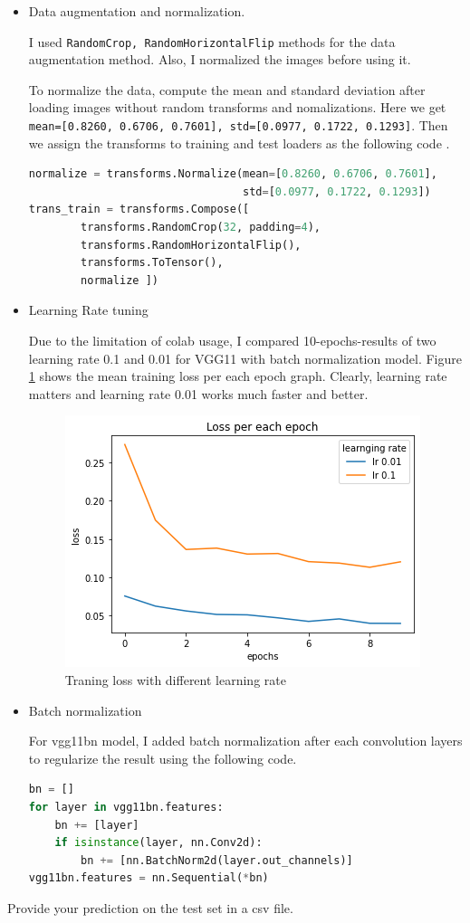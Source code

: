 \documentclass[11pt]{article}
\newcommand{\0}{{\mathbf{0}}}
\newcommand{\1}{{\mathbf{1}}}
\newcommand{\pr}[1]{\noindent{\bf #1.}}
\begin{document}
\begin{itemize}
\item Data augmentation and normalization.

I used \texttt{RandomCrop, RandomHorizontalFlip} methods for the data augmentation method. Also, I normalized the images before using it.

To normalize the data, compute the mean and standard deviation after loading images without random transforms and nomalizations. Here we get \texttt{mean=[0.8260, 0.6706, 0.7601], std=[0.0977, 0.1722, 0.1293]}. Then we assign the transforms to training and test loaders as the following code .

\begin{lstlisting}[language=Python]
normalize = transforms.Normalize(mean=[0.8260, 0.6706, 0.7601],
                                 std=[0.0977, 0.1722, 0.1293])
trans_train = transforms.Compose([
        transforms.RandomCrop(32, padding=4),
        transforms.RandomHorizontalFlip(),
        transforms.ToTensor(),
        normalize ])
\end{lstlisting}

\item Learning Rate tuning

Due to the limitation of colab usage, I compared 10-epochs-results of two learning rate 0.1 and 0.01 for VGG11 with batch normalization model. Figure \ref{fig:lr} shows the mean training loss per each epoch graph. Clearly, learning rate matters and learning rate 0.01 works much faster and better.

\begin{figure}
      \includegraphics[scale=0.6]{figures/lr_experiment.png}
      \centering
      \caption{Traning loss with different learning rate}
      \label{fig:lr}
\end{figure}

\item Batch normalization

For vgg11bn model, I added batch normalization after each convolution layers to regularize the result using the following code.

\begin{lstlisting}[language=Python]
bn = []
for layer in vgg11bn.features:
    bn += [layer]
    if isinstance(layer, nn.Conv2d):
        bn += [nn.BatchNorm2d(layer.out_channels)]
vgg11bn.features = nn.Sequential(*bn)
\end{lstlisting}

\end{itemize}

\pr{6} Provide your prediction on the test set in a csv file. 

\end{document}
